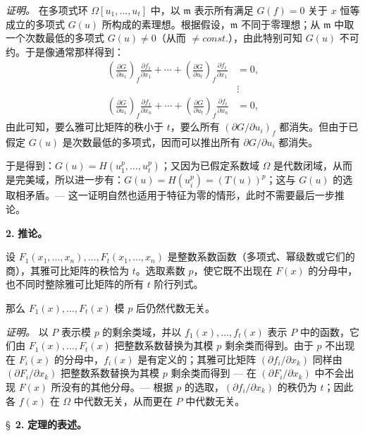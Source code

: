 \noindent\textit{证明。}
在多项式环 $\Omega[u_1,\ldots,u_t]$ 中，以 $\mathfrak{m}$ 表示所有满足 $G(f) = 0$ 关于 $x$ 恒等成立的多项式 $G(u)$ 所构成的素理想。根据假设，$\mathfrak{m}$ 不同于零理想；从 $\mathfrak{m}$ 中取一个次数最低的多项式 $G(u) \neq 0$（从而 $\neq {const.}$），由此特别可知 $G(u)$ 不可约。于是像通常那样得到：
\[
\begin{aligned}
\left(\frac{\partial G}{\partial u_1}\right)_{f}\frac{\partial f_1}{\partial x_1}
 +\cdots+
\left(\frac{\partial G}{\partial u_t}\right)_{f}\frac{\partial f_t}{\partial x_1}&=0,\\[-1mm]
&\vdots\\[-1mm]
\left(\frac{\partial G}{\partial u_1}\right)_{f}\frac{\partial f_1}{\partial x_n}
 +\cdots+
\left(\frac{\partial G}{\partial u_t}\right)_{f}\frac{\partial f_t}{\partial x_n}&=0,
\end{aligned}
\]
由此可知，要么雅可比矩阵的秩小于 $t$，要么所有 $\left(\partial G/\partial u_i\right)_{f}$ 都消失。但由于已假定 $G(u)$ 是次数最低的多项式，因而可以推出所有 $\partial G/\partial u_i$ 都消失。

于是得到：$G(u)=H(u_1^p,\ldots,u_t^p)$；又因为已假定系数域 $\Omega$ 是代数闭域，从而是完美域，所以进一步有：$G(u)=H(u_i^p)=(T(u))^p$；这与 $G(u)$ 的选取相矛盾。--- 这一证明自然也适用于特征为零的情形，此时不需要最后一步推论。

\medskip\noindent\textbf{2.} \textbf{推论。}

设 $F_1(x_1,\ldots,x_n),\ldots,F_t(x_1,\ldots,x_n)$ 是整数系数函数（多项式、幂级数或它们的商），其雅可比矩阵的秩恰为 $t$。选取素数 $p$，使它既不出现在 $F(x)$ 的分母中，也不同时整除雅可比矩阵的所有 $t$ 阶行列式。

那么 $F_1(x),\ldots,F_t(x)$ 模 $p$ 后仍然代数无关。

\noindent\textit{证明。}
以 $P$ 表示模 $p$ 的剩余类域，并以 $f_1(x),\ldots,f_t(x)$ 表示 $P$ 中的函数，它们由 $F_1(x),\ldots,F_t(x)$ 把整数系数替换为其模 $p$ 剩余类而得到。由于 $p$ 不出现在 $F_i(x)$ 的分母中，$f_i(x)$ 是有定义的；其雅可比矩阵 $(\partial f_i/\partial x_k)$ 同样由 $(\partial F_i/\partial x_k)$ 把整数系数替换为其模 $p$ 剩余类而得到 --- 在 $(\partial F_i/\partial x_k)$ 中不会出现 $F(x)$ 所没有的其他分母。--- 根据 $p$ 的选取，$(\partial f_i/\partial x_k)$ 的秩仍为 $t$；因此各 $f(x)$ 在 $\Omega$ 中代数无关，从而更在 $P$ 中代数无关。

\bigskip
\S~\textbf{2.}
\textbf{定理的表述。}

\smallskip

